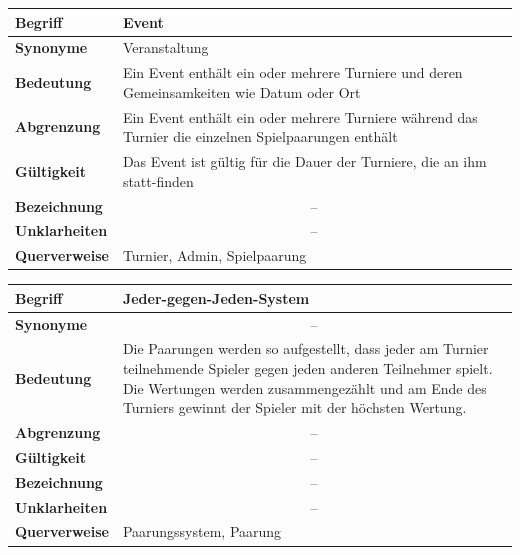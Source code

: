 \documentclass[11pt]{article}
\begin{document}
\begin{tabularx}{\textwidth}{| p{} | p{} |}
	\hline
	\textbf{Begriff} & Event\\
	\hline
	\textbf{Synonyme} & Veranstaltung \\
	\hline
	\textbf{Bedeutung} & Ein Event enthält ein oder mehrere Turniere und deren Gemeinsamkeiten wie Datum oder Ort\\
	\hline
	\textbf{Abgrenzung} & Ein Event enthält ein oder mehrere Turniere während das Turnier die einzelnen Spielpaarungen enthält\\
	\hline
	\textbf{Gültigkeit} & Das Event ist gültig für die Dauer der Turniere, die an ihm statt-finden\\
	\hline
	\textbf{Bezeichnung} & \multicolumn{1}{c|}{--} \\
	\hline
	\textbf{Unklarheiten} & \multicolumn{1}{c|}{--} \\
	\hline
	\textbf{Querverweise} & Turnier, Admin, Spielpaarung\\
	\hline
\end{tabularx}

\begin{tabularx}{\textwidth}{| p{} | p{} |}
	\hline
	\textbf{Begriff} & Jeder-gegen-Jeden-System\\ 
	\hline
	\textbf{Synonyme} & \multicolumn{1}{c|}{--}\\
	\hline 
	\textbf{Bedeutung} & Die Paarungen werden so aufgestellt, dass jeder am Turnier teilnehmende Spieler gegen jeden anderen Teilnehmer spielt. Die Wertungen werden zusammengezählt und am Ende des Turniers gewinnt der Spieler mit der höchsten Wertung.\\
	\hline
	\textbf{Abgrenzung} & \multicolumn{1}{c|}{--}\\
	\hline
	\textbf{Gültigkeit} & \multicolumn{1}{c|}{--}\\
	\hline
	\textbf{Bezeichnung} & \multicolumn{1}{c|}{--}\\
	\hline
	\textbf{Unklarheiten} & \multicolumn{1}{c|}{--} \\
	\hline
	\textbf{Querverweise} & Paarungssystem, Paarung\\
	\hline
\end{tabularx}
\end{document}
